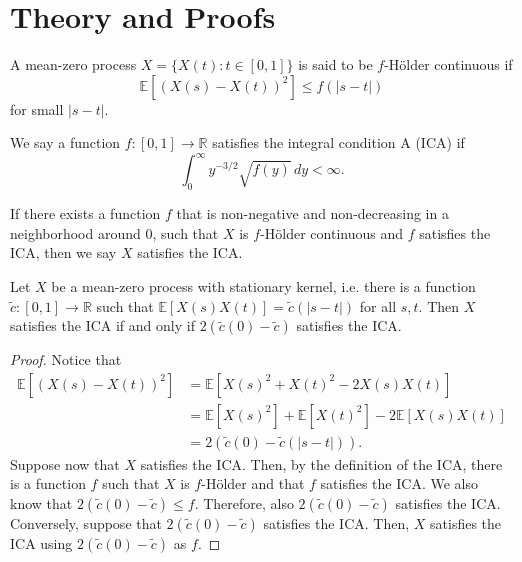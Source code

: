\section{Theory and Proofs}


\begin{definition}
    A mean-zero process $X = \{X(t) : t \in [0, 1]\}$ is said to be $f$-H\"older
    continuous if
    \[
        \mathbb{E}\left[(X(s) - X(t))^2 \right] \leq f(|s - t|)
    \]
    for small $|s-t|$.
\end{definition}


\begin{definition}
    We say a function $f: [0, 1] \to \mathbb{R}$ satisfies the integral condition A
    (ICA) if
    \[
        \int_0^\infty y^{-3/2} \sqrt{f(y)} \, dy < \infty.
    \]
\end{definition}

\begin{definition}
    If there exists a function $f$ that is non-negative and non-decreasing in a
    neighborhood around 0, such that $X$ is $f$-H\"older continuous and $f$ satisfies
    the ICA, then we say $X$ satisfies the ICA.
\end{definition}


\begin{proposition}
    Let $X$ be a mean-zero process with stationary kernel, i.e. there is a function
    $\tilde{c} : [0, 1] \to \mathbb{R}$ such that $\mathbb{E}[X(s) X(t)] = \tilde{c}(|s
    - t|)$ for all $s, t$. Then $X$ satisfies the ICA if and only if $2 (\tilde{c}(0) -
    \tilde{c})$ satisfies the ICA.
\end{proposition}
\begin{proof}
    Notice that
    \begin{align}
        \mathbb{E}\left[(X(s) - X(t))^2\right]
        &= \mathbb{E}\left[X(s)^2 + X(t)^2 - 2 X(s) X(t)\right] \\
        &= \mathbb{E}[X(s)^2] + \mathbb{E}[X(t)^2] - 2 \mathbb{E}[X(s) X(t)] \\
        &= 2 (\tilde{c}(0) - \tilde{c}(|s - t|)).
    \end{align}
    Suppose now that $X$ satisfies the ICA. Then, by the definition of the ICA, there is
    a function $f$ such that $X$ is $f$-H\"older and that $f$ satisfies the ICA. We also
    know that $2 (\tilde{c}(0) - \tilde{c}) \leq f$. Therefore, also $2 (\tilde{c}(0) -
    \tilde{c})$ satisfies the ICA. Conversely, suppose that $2 (\tilde{c}(0) -
    \tilde{c})$ satisfies the ICA. Then, $X$ satisfies the ICA using $2 (\tilde{c}(0) -
    \tilde{c})$ as $f$.
\end{proof}

